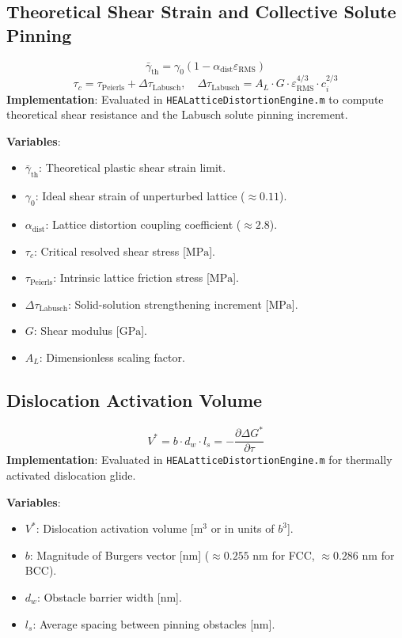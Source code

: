 \documentclass[11pt,a4paper]{article}
\begin{document}
\subsection{Theoretical Shear Strain and Collective Solute Pinning}
\begin{equation}
\bar{\gamma}_{\text{th}} = \gamma_0 \left(1 - \alpha_{\text{dist}} \varepsilon_{\text{RMS}}\right)
\end{equation}
\begin{equation}
\tau_c = \tau_{\text{Peierls}} + \Delta\tau_{\text{Labusch}}, \quad \Delta\tau_{\text{Labusch}} = A_L \cdot G \cdot \varepsilon_{\text{RMS}}^{4/3} \cdot c_i^{2/3}
\end{equation}
\textbf{Implementation}: Evaluated in \texttt{HEALatticeDistortionEngine.m} to compute theoretical shear resistance and the Labusch solute pinning increment.

\noindent\textbf{Variables}:
\begin{itemize}
  \item $\bar{\gamma}_{\text{th}}$: Theoretical plastic shear strain limit.
  \item $\gamma_0$: Ideal shear strain of unperturbed lattice ($\approx 0.11$).
  \item $\alpha_{\text{dist}}$: Lattice distortion coupling coefficient ($\approx 2.8$).
  \item $\tau_c$: Critical resolved shear stress [$\text{MPa}$].
  \item $\tau_{\text{Peierls}}$: Intrinsic lattice friction stress [$\text{MPa}$].
  \item $\Delta\tau_{\text{Labusch}}$: Solid-solution strengthening increment [$\text{MPa}$].
  \item $G$: Shear modulus [$\text{GPa}$].
  \item $A_L$: Dimensionless scaling factor.
\end{itemize}

\subsection{Dislocation Activation Volume}
\begin{equation}
V^* = b \cdot d_w \cdot l_s = -\frac{\partial \Delta G^*}{\partial \tau}
\end{equation}
\textbf{Implementation}: Evaluated in \texttt{HEALatticeDistortionEngine.m} for thermally activated dislocation glide.

\noindent\textbf{Variables}:
\begin{itemize}
  \item $V^*$: Dislocation activation volume [$\text{m}^3$ or in units of $b^3$].
  \item $b$: Magnitude of Burgers vector [$\text{nm}$] ($\approx 0.255\text{ nm}$ for FCC, $\approx 0.286\text{ nm}$ for BCC).
  \item $d_w$: Obstacle barrier width [$\text{nm}$].
  \item $l_s$: Average spacing between pinning obstacles [$\text{nm}$].
\end{itemize}
\end{document}
